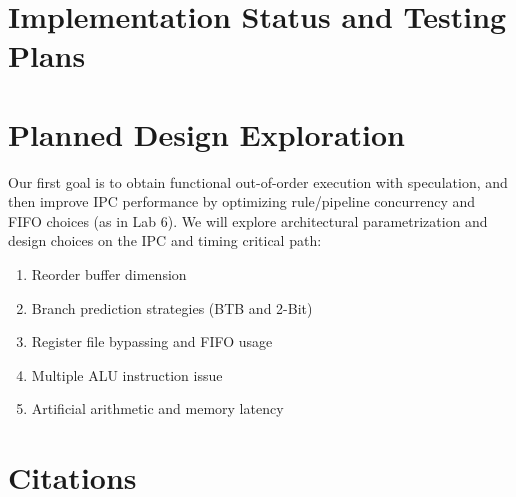 \documentclass[12pt]{article}
\begin{document}
    \section{Implementation Status and Testing Plans}

    \section{Planned Design Exploration}
    
    Our first goal is to obtain functional out-of-order execution with speculation, and then improve IPC performance by optimizing rule/pipeline concurrency and FIFO choices (as in Lab 6). We will explore architectural parametrization and design choices on the IPC and timing critical path:    
    \begin{enumerate}
        \item Reorder buffer dimension
        \item Branch prediction strategies (BTB and 2-Bit)
        \item Register file bypassing and FIFO usage
        \item Multiple ALU instruction issue
        \item Artificial arithmetic and memory latency
    \end{enumerate}
    
    \section{Citations}
    

 
\end{document}
